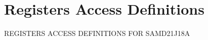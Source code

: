 \hypertarget{group___s_a_m_d21_j18_a__reg}{}\section{Registers Access Definitions}
\label{group___s_a_m_d21_j18_a__reg}
R\+E\+G\+I\+S\+T\+E\+RS A\+C\+C\+E\+SS D\+E\+F\+I\+N\+I\+T\+I\+O\+NS F\+OR S\+A\+M\+D21\+J18A 